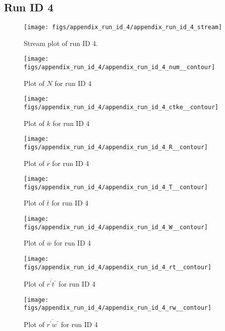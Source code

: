 \subsection{Run ID 4}
\begin{figure}[H]
\centering
\texttt{[image: figs/appendix\_run\_id\_4/appendix\_run\_id\_4\_stream]}
\caption{Stream plot of run ID 4.}
\label{fig:appendix_run_id_4_stream}
\end{figure}


\begin{figure}[H]
\centering
\texttt{[image: figs/appendix\_run\_id\_4/appendix\_run\_id\_4\_num\_\_contour]}
\caption{Plot of $N$ for run ID 4}
\label{fig:appendix_run_id_4_num__contour}
\end{figure}


\begin{figure}[H]
\centering
\texttt{[image: figs/appendix\_run\_id\_4/appendix\_run\_id\_4\_ctke\_\_contour]}
\caption{Plot of $k$ for run ID 4}
\label{fig:appendix_run_id_4_ctke__contour}
\end{figure}


\begin{figure}[H]
\centering
\texttt{[image: figs/appendix\_run\_id\_4/appendix\_run\_id\_4\_R\_\_contour]}
\caption{Plot of $\overline{r}$ for run ID 4}
\label{fig:appendix_run_id_4_R__contour}
\end{figure}


\begin{figure}[H]
\centering
\texttt{[image: figs/appendix\_run\_id\_4/appendix\_run\_id\_4\_T\_\_contour]}
\caption{Plot of $\overline{t}$ for run ID 4}
\label{fig:appendix_run_id_4_T__contour}
\end{figure}


\begin{figure}[H]
\centering
\texttt{[image: figs/appendix\_run\_id\_4/appendix\_run\_id\_4\_W\_\_contour]}
\caption{Plot of $\overline{w}$ for run ID 4}
\label{fig:appendix_run_id_4_W__contour}
\end{figure}


\begin{figure}[H]
\centering
\texttt{[image: figs/appendix\_run\_id\_4/appendix\_run\_id\_4\_rt\_\_contour]}
\caption{Plot of $\overline{r^\prime t^\prime}$ for run ID 4}
\label{fig:appendix_run_id_4_rt__contour}
\end{figure}


\begin{figure}[H]
\centering
\texttt{[image: figs/appendix\_run\_id\_4/appendix\_run\_id\_4\_rw\_\_contour]}
\caption{Plot of $\overline{r^\prime w^\prime}$ for run ID 4}
\label{fig:appendix_run_id_4_rw__contour}
\end{figure}



